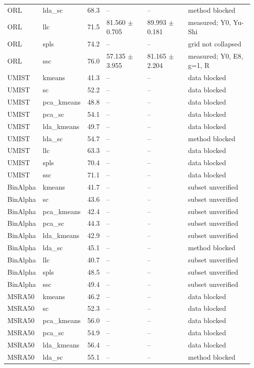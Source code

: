 \begin{longtable}{llrllp{2.9cm}}
ORL & lda\_sc & 68.3 & -- & -- & method blocked \\
ORL & llc & 71.5 & 81.560 $\pm$ 0.705 & 89.993 $\pm$ 0.181 & measured; Y0, Yu-Shi \\
ORL & spls & 74.2 & -- & -- & grid not collapsed \\
ORL & ssc & 76.0 & 57.135 $\pm$ 3.955 & 81.165 $\pm$ 2.204 & measured; Y0, E8, g=1, R \\
UMIST & kmeans & 41.3 & -- & -- & data blocked \\
UMIST & sc & 52.2 & -- & -- & data blocked \\
UMIST & pca\_kmeans & 48.8 & -- & -- & data blocked \\
UMIST & pca\_sc & 54.1 & -- & -- & data blocked \\
UMIST & lda\_kmeans & 49.7 & -- & -- & data blocked \\
UMIST & lda\_sc & 54.7 & -- & -- & method blocked \\
UMIST & llc & 63.3 & -- & -- & data blocked \\
UMIST & spls & 70.4 & -- & -- & data blocked \\
UMIST & ssc & 71.1 & -- & -- & data blocked \\
BinAlpha & kmeans & 41.7 & -- & -- & subset unverified \\
BinAlpha & sc & 43.6 & -- & -- & subset unverified \\
BinAlpha & pca\_kmeans & 42.4 & -- & -- & subset unverified \\
BinAlpha & pca\_sc & 44.3 & -- & -- & subset unverified \\
BinAlpha & lda\_kmeans & 42.9 & -- & -- & subset unverified \\
BinAlpha & lda\_sc & 45.1 & -- & -- & method blocked \\
BinAlpha & llc & 40.7 & -- & -- & subset unverified \\
BinAlpha & spls & 48.5 & -- & -- & subset unverified \\
BinAlpha & ssc & 49.4 & -- & -- & subset unverified \\
MSRA50 & kmeans & 46.2 & -- & -- & data blocked \\
MSRA50 & sc & 52.3 & -- & -- & data blocked \\
MSRA50 & pca\_kmeans & 56.0 & -- & -- & data blocked \\
MSRA50 & pca\_sc & 54.9 & -- & -- & data blocked \\
MSRA50 & lda\_kmeans & 56.4 & -- & -- & data blocked \\
MSRA50 & lda\_sc & 55.1 & -- & -- & method blocked \\

\end{longtable}

